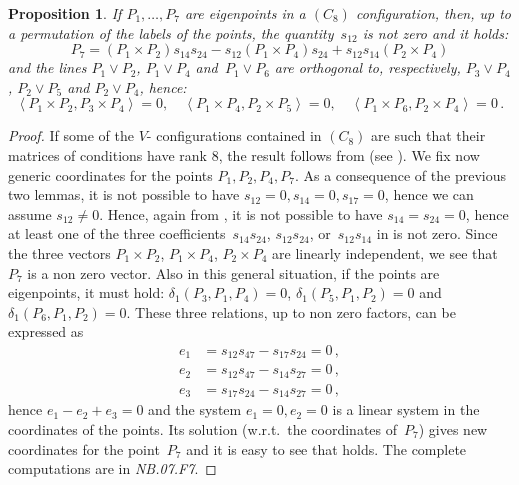 \documentclass[a4paper, 11pt, reqno]{amsart}
\theoremstyle{plain}
\newtheorem{prop}[lemma]{Proposition}
\theoremstyle{definition}
\newcommand{\nb}[2]{\textsl{{NB}.{#1}.{#2}}}
\newcommand{\scl}[2]{\left\langle {#1}, {#2} \right\rangle}
\begin{document}
\begin{prop}
\label{prop:conf8_partA}
If $P_1, \dotsc, P_7$ are eigenpoints in a $(C_8)$ configuration, then, up to a permutation of 
the labels of the points, the quantity~$s_{12}$ is not zero and it holds:
\begin{equation}
\label{formula:ortocentro}
P_7 = (P_1 \times P_2)s_{14}s_{24} -
  s_{12}(P_1 \times P_4)s_{24} + s_{12}s_{14}(P_2 \times P_4)
\end{equation}
and the lines $P_1 \vee P_2$, $P_1 \vee P_4$ and~$P_1 \vee P_6$
are orthogonal to, respectively, $P_3 \vee P_4$, $P_2 \vee P_5$ and 
$P_2 \vee P_4$, hence:
%
\[
  \scl{P_1 \times P_2}{P_3 \times P_4} = 0, \quad 
  \scl{P_1 \times P_4}{P_2 \times P_5} = 0, \quad 
  \scl{P_1 \times P_6}{P_2 \times P_4} = 0 \,.
\]
%
\end{prop}
\begin{proof}
If some of the $V$- configurations contained in $(C_8)$ are such that their matrices of conditions have rank $8$, 
the result follows from  (see ).
We fix now generic coordinates for the points $P_1, P_2, P_4, P_7$.
As a consequence of the previous two lemmas, it is not possible
to have $s_{12}=0, s_{14}=0, s_{17}=0$, hence we can assume $s_{12} \not=0$.
Hence, again from , it is not possible to 
have $s_{14}=s_{24}=0$, hence at least one of the three coefficients~$s_{14}s_{24}$, $s_{12}s_{24}$, or~$s_{12}s_{14}$  in  is not zero. Since the 
three vectors $P_1\times P_2$, $P_1\times P_4$, $P_2\times P_4$ are linearly independent, we see that $P_7$ is a non zero vector. Also in this general situation, if the points are eigenpoints, it must hold: 
$\delta_1(P_3, P_1, P_4) = 0$, $\delta_1(P_5, P_1, P_2) = 0$ and 
$\delta_1(P_6, P_1, P_2)=0$. These three relations, up to non zero factors, can be expressed as 
%
\begin{align*}
 e_1 &= s_{12}s_{47}-s_{17}s_{24} =0\,,\\
 e_2 &= s_{12}s_{47}-s_{14}s_{27} =0\,,\\ 
 e_3 &= s_{17}s_{24}-s_{14}s_{27} =0\,,
\end{align*}
%
hence $e_1-e_2+e_3 = 0$ and the system
$e_1=0, e_2 = 0$ is a linear system in the coordinates of the points. 
Its solution (w.r.t.\ the coordinates of~$P_7$) gives new coordinates for the point~$P_7$ and it is easy to see that  holds. The complete computations are in \nb{07}{F7}.
\end{proof}
\end{document}
